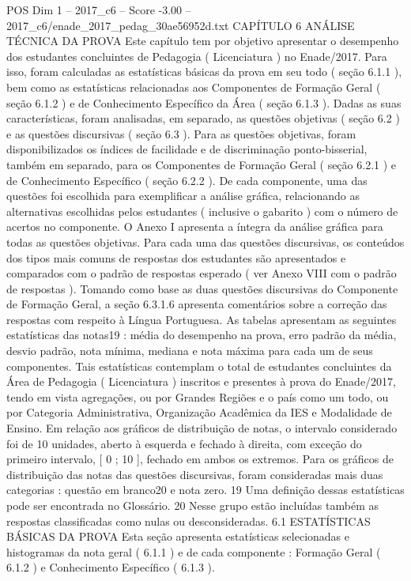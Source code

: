 \begin{textsample}{POS Dim 1 – 2017\_c6 – Score -3.00 – 2017\_c6/enade\_2017\_pedag\_30ae56952d.txt}  \label{ex:f1_pos_298}
CAPÍTULO 6 ANÁLISE TÉCNICA DA PROVA Este capítulo tem por objetivo apresentar o desempenho dos estudantes concluintes de Pedagogia ( Licenciatura ) no Enade/2017.
Para isso, foram calculadas as estatísticas básicas da prova em seu todo ( seção 6.1.1 ), bem como as estatísticas relacionadas aos Componentes de Formação Geral ( seção 6.1.2 ) e de Conhecimento Específico da Área ( seção 6.1.3 ).
Dadas as suas características, foram analisadas, em separado, as questões objetivas ( seção 6.2 ) e as questões discursivas ( seção 6.3 ).
Para as questões objetivas, foram disponibilizados os índices de facilidade e de discriminação ponto-bisserial, também em separado, para os Componentes de Formação Geral ( seção 6.2.1 ) e de Conhecimento Específico ( seção 6.2.2 ).
De cada componente, uma das questões foi escolhida para exemplificar a análise gráfica, relacionando as alternativas escolhidas pelos estudantes ( inclusive o gabarito ) com o número de acertos no componente.
O Anexo I apresenta a íntegra da análise gráfica para todas as questões objetivas.
Para cada uma das questões discursivas, os conteúdos dos tipos mais comuns de respostas dos estudantes são apresentados e comparados com o padrão de respostas esperado ( ver Anexo VIII com o padrão de respostas ).
Tomando como base as duas questões discursivas do Componente de Formação Geral, a seção 6.3.1.6 apresenta comentários sobre a correção das respostas com respeito à Língua Portuguesa.
As tabelas apresentam as seguintes estatísticas das notas19 : média do desempenho na prova, erro padrão da média, desvio padrão, nota mínima, mediana e nota máxima para cada um de seus componentes.
Tais estatísticas contemplam o total de estudantes concluintes da Área de Pedagogia ( Licenciatura ) inscritos e presentes à prova do Enade/2017, tendo em vista agregações, ou por Grandes Regiões e o país como um todo, ou por Categoria Administrativa, Organização Acadêmica da IES e Modalidade de Ensino.
Em relação aos gráficos de distribuição de notas, o intervalo considerado foi de 10 unidades, aberto à esquerda e fechado à direita, com exceção do primeiro intervalo, [ 0 ; 10 ], fechado em ambos os extremos.
Para os gráficos de distribuição das notas das questões discursivas, foram consideradas mais duas categorias : questão em branco20 e nota zero. 19 Uma definição dessas estatísticas pode ser encontrada no Glossário. 20 Nesse grupo estão incluídas também as respostas classificadas como nulas ou desconsideradas. 6.1 ESTATÍSTICAS BÁSICAS DA PROVA Esta seção apresenta estatísticas selecionadas e histogramas da nota geral ( 6.1.1 ) e de cada componente : Formação Geral ( 6.1.2 ) e Conhecimento Específico ( 6.1.3 ).

\end{textsample}
